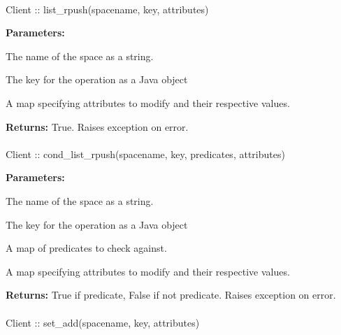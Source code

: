 \paragraph{}
\label{api:java:list_rpush}
\begin{javacode}
Client :: list_rpush(spacename, key, attributes)
\end{javacode}


\noindent\textbf{Parameters:}
\begin{description}[labelindent=\widthof{{\code{attributes}}},leftmargin=*,noitemsep,nolistsep,align=right]
\item[\code{spacename}] The name of the space as a string.
\item[\code{key}] The key for the operation as a Java object
\item[\code{attributes}] A map specifying attributes to modify and their respective values.
\end{description}

\noindent\textbf{Returns:}
True.  Raises exception on error.

\paragraph{}
\label{api:java:cond_list_rpush}
\begin{javacode}
Client :: cond_list_rpush(spacename, key, predicates, attributes)
\end{javacode}


\noindent\textbf{Parameters:}
\begin{description}[labelindent=\widthof{{\code{predicates}}},leftmargin=*,noitemsep,nolistsep,align=right]
\item[\code{spacename}] The name of the space as a string.
\item[\code{key}] The key for the operation as a Java object
\item[\code{predicates}] A map of predicates to check against.
\item[\code{attributes}] A map specifying attributes to modify and their respective values.
\end{description}

\noindent\textbf{Returns:}
True if predicate, False if not predicate.  Raises exception on error.

\paragraph{}
\label{api:java:set_add}
\begin{javacode}
Client :: set_add(spacename, key, attributes)
\end{javacode}


